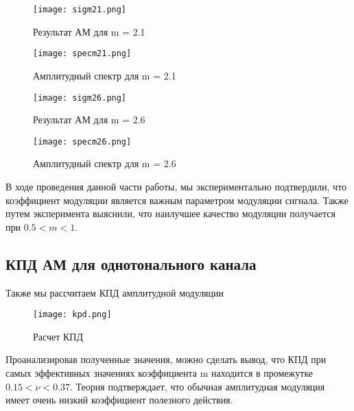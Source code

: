 \begin{figure}[H]
	\begin{center}
		\texttt{[image: sigm21.png]}
		\caption{Результат АМ для m = 2.1} 
		\label{pic:pic01} %
	\end{center}
\end{figure} 

\begin{figure}[H]
	\begin{center}
		\texttt{[image: specm21.png]}
		\caption{Амплитудный спектр для m = 2.1} 
		\label{pic:pic02} %
	\end{center}
\end{figure}
\begin{figure}[H]
	\begin{center}
		\texttt{[image: sigm26.png]}
		\caption{Результат АМ для m = 2.6} 
		\label{pic:pic01} %
	\end{center}
\end{figure} 

\begin{figure}[H]
	\begin{center}
		\texttt{[image: specm26.png]}
		\caption{Амплитудный спектр для m = 2.6} 
		\label{pic:pic02} %
	\end{center}
\end{figure} 
В ходе проведения данной части работы, мы экспериментально подтвердили, что коэффициент модуляции
является важным параметром модуляции сигнала. Также путем эксперимента выяснили,
что наилучшее качество модуляции получается при $ 0.5 < m < 1 $. 
\subsection{КПД АМ для однотонального канала}
Также мы рассчитаем КПД амплитудной модуляции 

\begin{figure}[H]
	\begin{center}
		\texttt{[image: kpd.png]}
		\caption{Расчет КПД} 
		\label{pic:pic02} %
	\end{center}
\end{figure} 

Проанализировав полученные значения, можно сделать вывод, что КПД при самых эффективных значениях коэффициента m
находится в промежутке $ 0.15 < \nu < 0.37 $. Теория подтверждает, что обычная амплитудная модуляция
имеет очень низкий коэффициент полезного действия.

